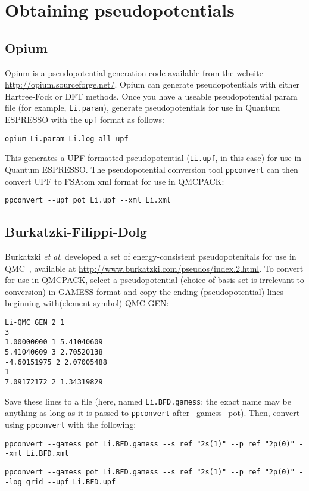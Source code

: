 \section{Obtaining pseudopotentials}

\subsection{Opium}

Opium is a pseudopotential generation code available from the website \url{http://opium.sourceforge.net/}.  Opium can generate pseudopotentials with either Hartree-Fock or DFT methods.  Once you have a useable pseudopotential param file (for example, \texttt{Li.param}), generate pseudopotentials for use in Quantum ESPRESSO with the \texttt{upf} format as follows:
\begin{lstlisting}[caption=Generate UPF-formatted pseudopotential with Opium]
opium Li.param Li.log all upf
\end{lstlisting}
This generates a UPF-formatted pseudopotential (\texttt{Li.upf}, in this case) for use in Quantum ESPRESSO.  The pseudopotential conversion tool \texttt{ppconvert} can then convert UPF to FSAtom xml format for use in QMCPACK:
\begin{lstlisting}[caption=Convert UPF-formatted pseudopotential to FSAtom xml format]
ppconvert --upf_pot Li.upf --xml Li.xml
\end{lstlisting}

\subsection{Burkatzki-Filippi-Dolg}
\label{subsec:BFD}

Burkatzki \textit{et al.} developed a set of energy-consistent pseudopotenitals for use in QMC~\cite{Burkatzki07,Burkatzki08}, available at \url{http://www.burkatzki.com/pseudos/index.2.html}.  To convert for use in QMCPACK, select a pseudopotential (choice of basis set is irrelevant to conversion) in GAMESS format and copy the ending (pseudopotential) lines beginning with(element symbol)-QMC GEN:

\begin{lstlisting}[caption=BFD Li pseudopotential in GAMESS format]
Li-QMC GEN 2 1
3
1.00000000 1 5.41040609
5.41040609 3 2.70520138
-4.60151975 2 2.07005488
1
7.09172172 2 1.34319829
\end{lstlisting}
Save these lines to a file (here, named \texttt{Li.BFD.gamess}; the exact name may be anything as long as it is passed to \texttt{ppconvert} after --gamess\_pot).  Then, convert using \texttt{ppconvert} with the following:
\begin{lstlisting}[caption=Convert GAMESS-formatted pseudopotential to FSAtom xml format]
  ppconvert --gamess_pot Li.BFD.gamess --s_ref "2s(1)" --p_ref "2p(0)" --xml Li.BFD.xml
\end{lstlisting}
\begin{lstlisting}[caption=Convert GAMESS-formatted pseudopotential to Quantum ESPRESSO UPF format]
  ppconvert --gamess_pot Li.BFD.gamess --s_ref "2s(1)" --p_ref "2p(0)" --log_grid --upf Li.BFD.upf
\end{lstlisting}

